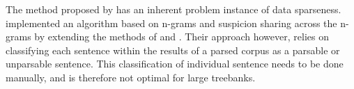 The method proposed by \citeauthor{boyd} has an inherent problem instance of data sparseness. \cite{kook} implemented an algorithm based on n-grams and suspicion sharing across the n-grams by extending the methods of \cite{sagot} and \cite{noord}. Their approach however, relies on classifying each sentence within the results of a parsed corpus as a parsable or unparsable sentence. This classification of individual sentence needs to be done manually, and is therefore not optimal for large treebanks.

\newpage